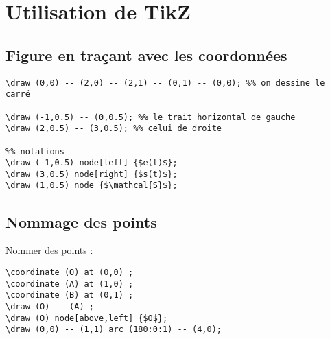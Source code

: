 \chapter{Utilisation de TikZ}
\minitoc


\newpage
\section{Figure en traçant avec les coordonnées}

\begin{verbatim}
\draw (0,0) -- (2,0) -- (2,1) -- (0,1) -- (0,0); %% on dessine le carré

\draw (-1,0.5) -- (0,0.5); %% le trait horizontal de gauche
\draw (2,0.5) -- (3,0.5); %% celui de droite

%% notations
\draw (-1,0.5) node[left] {$e(t)$};
\draw (3,0.5) node[right] {$s(t)$};
\draw (1,0.5) node {$\mathcal{S}$};
\end{verbatim}



%

\newpage
\section{Nommage des points}
Nommer des points :
\begin{verbatim}
\coordinate (O) at (0,0) ;
\coordinate (A) at (1,0) ;
\coordinate (B) at (0,1) ;
\draw (O) -- (A) ;
\draw (O) node[above,left] {$O$};
\draw (0,0) -- (1,1) arc (180:0:1) -- (4,0);
\end{verbatim}



